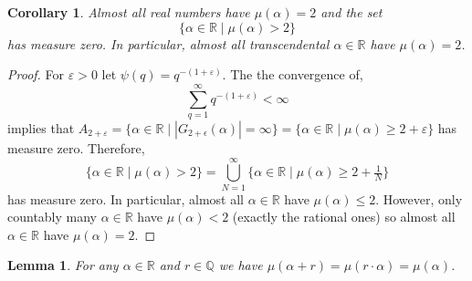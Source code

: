 \documentclass{article}
\newcommand{\Q}{\mathbb{Q}}
\newcommand{\R}{\mathbb{R}}
\theoremstyle{theorem}
\newtheorem{lemma}[theorem]{Lemma}
\newtheorem{corollary}[theorem]{Corollary}
\theoremstyle{definition}
\theoremstyle{definition}
\theoremstyle{remark}
\theoremstyle{definition}
\theoremstyle{remark}
\begin{document}
\begin{corollary}
Almost all real numbers have $\mu(\alpha) = 2$ and the set
\[ \{ \alpha \in \R \mid \mu(\alpha) > 2 \} \]
has measure zero. In particular, almost all transcendental $\alpha \in \R$ have $\mu(\alpha) = 2$.  
\end{corollary}

\begin{proof}
For $\varepsilon > 0$ let $\psi(q) = q^{-(1 + \varepsilon)}$. The the convergence of,
\[ \sum_{q = 1}^\infty q^{-(1 + \varepsilon)} < \infty \]
implies that $A_{2 + \varepsilon} = \{ \alpha \in \R \mid |G_{2 + \epsilon}(\alpha)| = \infty \} = \{ \alpha \in \R \mid \mu(\alpha) \ge 2 + \varepsilon\}$ has measure zero. Therefore, 
\[ \{ \alpha \in \R \mid \mu(\alpha) > 2 \} = \bigcup_{N = 1}^\infty \{ \alpha \in \R \mid \mu(\alpha) \ge 2 + \tfrac{1}{N} \} \]
has measure zero. In particular, almost all $\alpha \in \R$ have $\mu(\alpha) \le 2$. However, only countably many $\alpha \in \R$ have $\mu(\alpha) < 2$ (exactly the rational ones) so almost all $\alpha \in \R$ have $\mu(\alpha) = 2$. 
\end{proof}


\begin{lemma}
For any $\alpha \in \R$ and $r \in \Q$ we have $\mu(\alpha + r) = \mu(r \cdot \alpha) = \mu(\alpha)$. 
\end{lemma}
\end{document}
